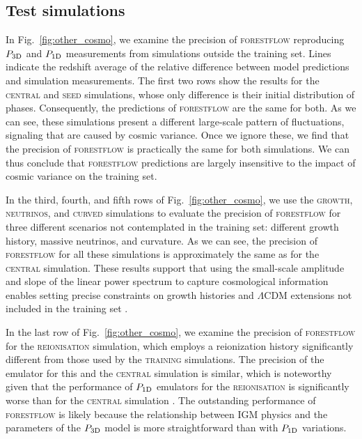 \documentclass[fleqn,usenatbib]{mnras}
\newcommand{\poned}{\ensuremath{P_{\rm 1D}}\xspace}
\newcommand{\pthreed}{\ensuremath{P_{\rm 3D}}\xspace}
\newcommand{\forestflow}{\textsc{forestflow}\xspace}
\newcommand{\lacehc}{\textsc{training}\xspace}
\newcommand{\simseed}{\textsc{seed}\xspace}
\newcommand{\simigm}{\textsc{reionisation}\xspace}
\newcommand{\simcurved}{\textsc{curved}\xspace}
\newcommand{\simh}{\textsc{growth}\xspace}
\newcommand{\simnu}{\textsc{neutrinos}\xspace}
\newcommand{\simcentral}{\textsc{central}\xspace}
\begin{document}
\subsection{Test simulations}
\label{sec:results_other}

In Fig.~\ref{fig:other_cosmo}, we examine the precision of \forestflow reproducing \pthreed and \poned measurements from simulations outside the training set. Lines indicate the redshift average of the relative difference between model predictions and simulation measurements. The first two rows show the results for the \simcentral and \simseed simulations, whose only difference is their initial distribution of phases. Consequently, the predictions of \forestflow are the same for both. As we can see, these simulations present a different large-scale pattern of fluctuations, signaling that are caused by cosmic variance. Once we ignore these, we find that the precision of \forestflow is practically the same for both simulations. We can thus conclude that \forestflow predictions are largely insensitive to the impact of cosmic variance on the training set.

In the third, fourth, and fifth rows of Fig.~\ref{fig:other_cosmo}, we use the \simh, \simnu, and \simcurved simulations to evaluate the precision of \forestflow for three different scenarios not contemplated in the training set: different growth history, massive neutrinos, and curvature. As we can see, the precision of \forestflow for all these simulations is approximately the same as for the \simcentral simulation. These results support that using the small-scale amplitude and slope of the linear power spectrum to capture cosmological information enables setting precise constraints on growth histories and $\Lambda$CDM extensions not included in the training set \citep[see also][]{Pedersen2021, pedersen2023CompressingCosmologicalInformation, cabayol-garcia2023NeuralNetworkEmulator}.

In the last row of Fig.~\ref{fig:other_cosmo}, we examine the precision of \forestflow for the \simigm simulation, which employs a  reionization history significantly different from those used by the \lacehc simulations. The precision of the emulator for this and the \simcentral simulation is similar, which is noteworthy given that the performance of \poned emulators for the \simigm is significantly worse than for the \simcentral simulation \citep{cabayol-garcia2023NeuralNetworkEmulator}. The outstanding performance of \forestflow is likely because the relationship between IGM physics and the parameters of the \pthreed model is more straightforward than with \poned variations.
\end{document}
